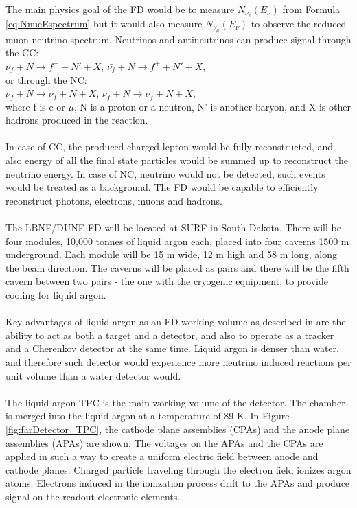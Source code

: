 The main physics goal of the FD would be to measure $N_{\nu_e}(E_{\nu})$  from Formula \ref{eq:NnueEspectrum} but it would also measure $N_{\nu_\mu}(E_{\nu})$ to observe the reduced muon neutrino spectrum. Neutrinos and antineutrinos can produce signal through the CC:\\
$\nu_f+N \rightarrow f^- + N' +X$, $\bar{\nu_f}+N \rightarrow f^+ + N' +X$,\\
or through the NC:\\
$\nu_f+N \rightarrow \nu_f + N +X$, $\bar{\nu_f}+N \rightarrow \bar{\nu_f} + N +X$,\\
where f is e or $\mu$, N is a proton or a neutron, N' is another baryon, and X is other hadrons produced in the reaction.\\ \\
In case of CC, the produced charged lepton would be fully reconstructed, and also energy of all the final state particles would be summed up to reconstruct the neutrino energy. In case of NC, neutrino would not be detected, such events would be treated as a background.
The FD would be capable to efficiently reconstruct photons, electrons, muons and hadrons. \\ \\
The LBNF/DUNE FD will be located at SURF in South Dakota. There will be four modules, 10,000 tonnes of liquid argon each, placed into four caverns 1500 m underground. Each module will be 15 m wide, 12 m high and 58 m long, along the beam direction. The caverns will be placed as pairs and there will be the fifth cavern between two pairs - the one with the cryogenic equipment, to provide cooling for liquid argon.\\ \\
Key advantages of liquid argon as an FD working volume as described in \cite{ref_aboutLAr} are the ability to act as both a target and a detector, and also to operate as a tracker and a Cherenkov detector at the same time. Liquid argon is denser than water, and therefore such detector would experience more neutrino induced reactions per unit volume than a water detector would. \\ \\
The liquid argon TPC is the main working volume of the detector. The chamber is merged into the liquid argon at a temperature of 89 K. In Figure \ref{fig:farDetector_TPC}, the cathode plane assemblies (CPAs) and the anode plane assemblies (APAs) are shown. The voltages on the APAs and the CPAs are applied in such a way to create a uniform electric field between anode and cathode planes. Charged particle traveling through the electron field ionizes argon atoms. Electrons induced in the ionization process drift to the APAs and produce signal on the readout electronic elements.\\ \\
